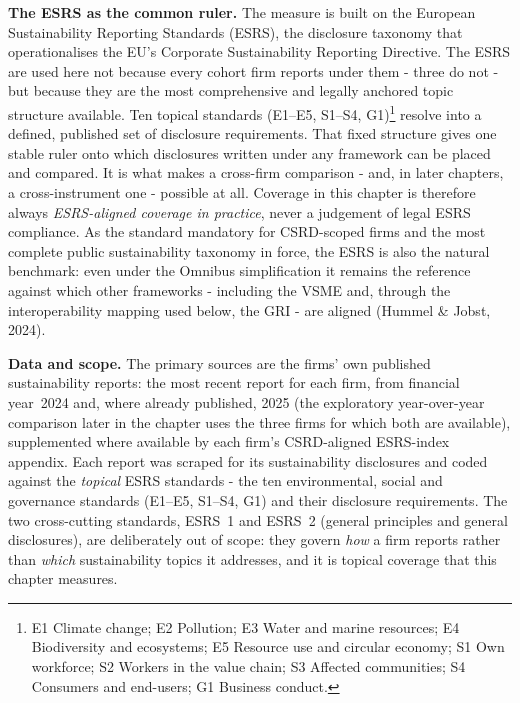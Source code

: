 \textbf{The ESRS as the common ruler.} The measure is built on the European
Sustainability Reporting Standards (ESRS), the disclosure taxonomy that
operationalises the EU's Corporate Sustainability Reporting Directive. The ESRS
are used here not because every cohort firm reports under them - three do not -
but because they are the most comprehensive and legally anchored topic structure
available. Ten topical standards (E1--E5, S1--S4, G1)\footnote{E1 Climate
change; E2 Pollution; E3 Water and marine resources; E4 Biodiversity and
ecosystems; E5 Resource use and circular economy; S1 Own workforce; S2
Workers in the value chain; S3 Affected communities; S4 Consumers and
end-users; G1 Business conduct.} resolve into a defined, published set of
disclosure requirements. That fixed structure gives one stable ruler onto which
disclosures written under any framework can be placed and compared. It is what
makes a cross-firm comparison - and, in later chapters, a cross-instrument
one - possible at all. Coverage in this chapter is
therefore always \emph{ESRS-aligned coverage in practice}, never a judgement of
legal ESRS compliance. As the standard mandatory for CSRD-scoped firms and the
most complete public sustainability taxonomy in force, the ESRS is also the
natural benchmark: even under the Omnibus simplification it remains the reference
against which other frameworks - including the VSME and, through the
interoperability mapping used below, the GRI - are aligned (Hummel \& Jobst,
2024).

\textbf{Data and scope.} The primary sources are the firms' own published
sustainability reports: the most recent report for each firm, from financial
year~2024 and, where already published, 2025 (the exploratory year-over-year comparison later in the chapter
uses the three firms for which both are available), supplemented
where available by each firm's CSRD-aligned ESRS-index appendix. Each report was
scraped for its sustainability disclosures and coded against the \emph{topical}
ESRS standards - the ten environmental, social and governance standards (E1--E5,
S1--S4, G1) and their
disclosure requirements. The two cross-cutting standards, ESRS~1 and ESRS~2
(general principles and general disclosures), are deliberately out of scope: they
govern \emph{how} a firm reports rather than \emph{which} sustainability topics it
addresses, and it is topical coverage that this chapter measures.

